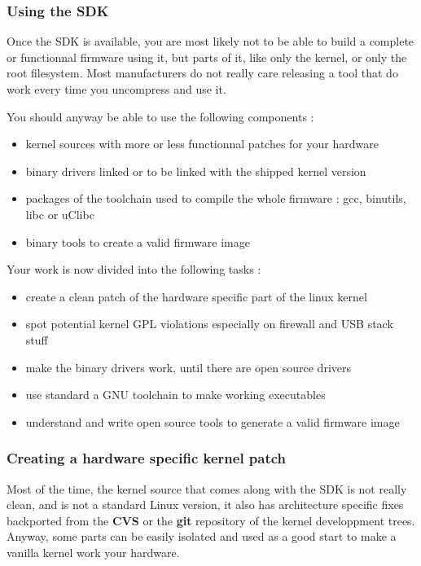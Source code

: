 \subsubsection{Using the SDK}

Once the SDK is available, you are most likely not to be able to build a complete or functionnal firmware using it, but parts of it, like only the kernel, or only the root filesystem. Most manufacturers do not really care releasing a tool that do work every time you uncompress and use it.

You should anyway be able to use the following components :

\begin{itemize}
\item kernel sources with more or less functionnal patches for your hardware
\item binary drivers linked or to be linked with the shipped kernel version
\item packages of the toolchain used to compile the whole firmware : gcc, binutils, libc or uClibc
\item binary tools to create a valid firmware image
\end{itemize}

Your work is now divided into the following tasks :

\begin{itemize}
\item create a clean patch of the hardware specific part of the linux kernel
\item spot potential kernel GPL violations especially on firewall and USB stack stuff
\item make the binary drivers work, until there are open source drivers
\item use standard a GNU toolchain to make working executables
\item understand and write open source tools to generate a valid firmware image
\end{itemize}

\subsubsection{Creating a hardware specific kernel patch}

Most of the time, the kernel source that comes along with the SDK is not really clean, and is not a standard Linux version, it also has architecture specific fixes backported from the \textbf{CVS} or the \textbf{git} repository of the kernel developpment trees. Anyway, some parts can be easily isolated and used as a good start to make a vanilla kernel work your hardware.

